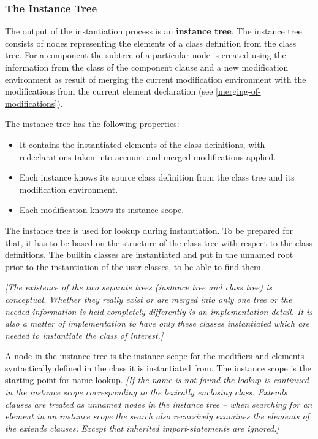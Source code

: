 \documentclass[10pt,a4paper]{report}
\def\doublelabel#1{\label{#1}\hypertarget{#1}{}}
\begin{document}
\subsubsection{The Instance Tree}\doublelabel{the-instance-tree}

The output of the instantiation process is an \textbf{instance tree}.
The instance tree consists of nodes representing the elements of a class
definition from the class tree. For a component the subtree of a
particular node is created using the information from the class of the
component clause and a new modification environment as result of merging
the current modification environment with the modifications from the
current element declaration (see \ref{merging-of-modifications}).

The instance tree has the following properties:

\begin{itemize}
\item
  It contains the instantiated elements of the class definitions, with
  redeclarations taken into account and merged modifications applied.
\end{itemize}

\begin{itemize}
\item
  Each instance knows its source class definition from the class tree
  and its modification environment.
\item
  Each modification knows its instance scope.
\end{itemize}

The instance tree is used for lookup during instantiation. To be
prepared for that, it has to be based on the structure of the class tree
with respect to the class definitions. The builtin classes are
instantiated and put in the unnamed root prior to the instantiation of
the user classes, to be able to find them.

\emph{{[}The existence of the two separate trees (instance tree and
class tree) is conceptual. Whether they really exist or are merged into
only one tree or the needed information is held completely differently
is an implementation detail. It is also a matter of implementation to
have only these classes instantiated which are needed to instantiate the
class of interest.{]} }

A node in the instance tree is the instance scope for the modifiers and
elements syntactically defined in the class it is instantiated from. The
instance scope is the starting point for name lookup. \emph{{[}If the
name is not found the lookup is continued in the instance scope
corresponding to the lexically enclosing class. Extends clauses are
treated as unnamed nodes in the instance tree -- when searching for an
element in an instance scope the search also recursively examines the
elements of the extends clauses.} \emph{Except that inherited
import-statements are ignored.{]}}
\end{document}
